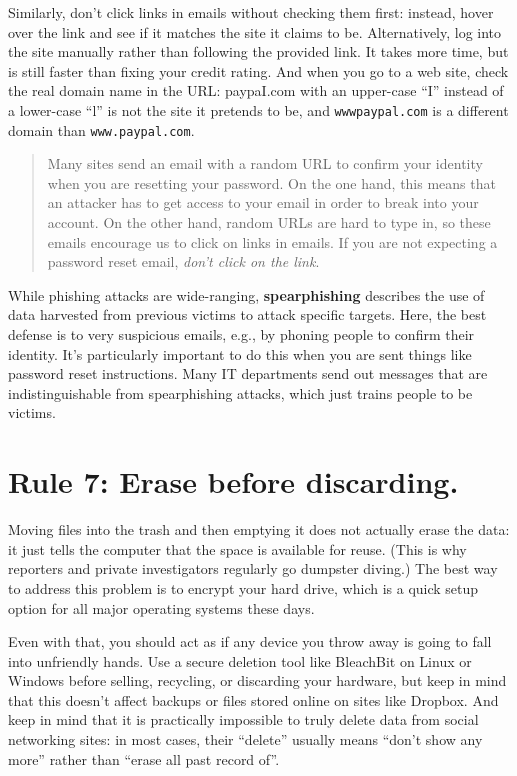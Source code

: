\documentclass[10pt,letterpaper]{article}
\begin{document}
Similarly, don't click links in emails without checking them first: instead,
hover over the link and see if it matches the site it claims to be.
Alternatively, log into the site manually rather than following the provided
link. It takes more time, but is still faster than fixing your credit rating.
And when you go to a web site, check the real domain name in the URL: paypaI.com
with an upper-case ``I'' instead of a lower-case ``l'' is not the site it
pretends to be, and \texttt{wwwpaypal.com} is a different domain than
\texttt{www.paypal.com}.

\begin{quote}
  Many sites send an email with a random URL to confirm your identity when you
  are resetting your password. On the one hand, this means that an attacker has
  to get access to your email in order to break into your account. On the other
  hand, random URLs are hard to type in, so these emails encourage us to click
  on links in emails. If you are not expecting a password reset
  email, \emph{don't click on the link}.
\end{quote}

While phishing attacks are wide-ranging, \textbf{spearphishing} describes the
use of data harvested from previous victims to attack specific targets. Here,
the best defense is to very suspicious emails, e.g., by phoning people to
confirm their identity. It's particularly important to do this when you are sent
things like password reset instructions. Many IT departments send out messages
that are indistinguishable from spearphishing attacks, which just trains people
to be victims.

\section*{Rule 7: Erase before discarding.}

Moving files into the trash and then emptying it does not actually erase the
data: it just tells the computer that the space is available for reuse. (This is
why reporters and private investigators regularly go dumpster diving.) The best
way to address this problem is to encrypt your hard drive, which is a quick
setup option for all major operating systems these days.

Even with that, you should act as if any device you throw away is going to fall
into unfriendly hands. Use a secure deletion tool like BleachBit on Linux or
Windows before selling, recycling, or discarding your hardware, but keep in mind
that this doesn't affect backups or files stored online on sites like
Dropbox. And keep in mind that it is practically impossible to truly delete data
from social networking sites: in most cases, their ``delete'' usually means
``don't show any more'' rather than ``erase all past record of''.
\end{document}
